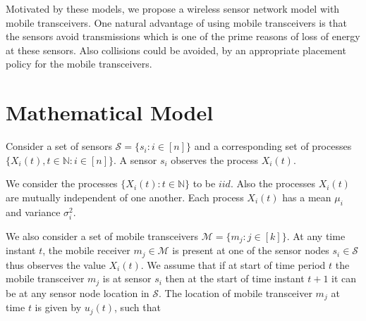 \documentclass[a4paper,english,12pt]{article}
\begin{document}
Motivated by these models, we propose a wireless sensor network model with mobile transceivers. %
One natural advantage of using mobile transceivers is that the sensors avoid  transmissions  which is one of the prime reasons of loss of energy at these sensors. Also collisions could be avoided, by an appropriate placement policy for the mobile transceivers.



















\section{Mathematical Model}\label{model}
Consider a set of sensors $\mathcal{S}=\{s_i:i \in [n]\}$ and a corresponding set of processes  $\{X_i(t), t \in \mathbb{N} : i \in [n]\}$. A sensor $s_i$ observes the process $X_i(t)$. 
 
We consider the processes $\{X_i(t): t \in \mathbb{N}\}$  to be $\textit{iid}$. Also the processes $X_i(t)$ are mutually independent of one another. Each process $X_i(t)$ has a mean  $\mu_i$ and variance  $\sigma_i^2$.

We also consider a set of mobile transceivers $\mathcal{M}=\{m_j: j \in [k]\}$. At any time instant $t$, the mobile receiver $m_j \in \mathcal{M}$ is present at one of the sensor nodes $s_i \in \mathcal{S}$ thus observes the value $X_i(t)$. We assume that if at start of time period $t$ the mobile transceiver $m_j$ is at sensor $s_i$ then at the start of time instant $t+1$ it can be at any sensor node location in $\mathcal{S}$.   The location of mobile transceiver $m_j$ at time $t$ is given by $u_j(t)$, such that 
\end{document}
